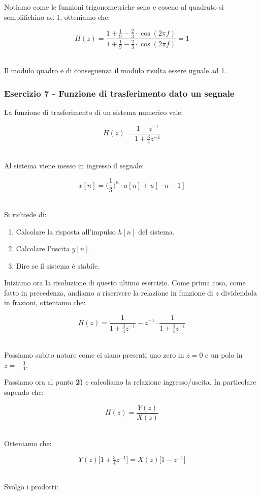 \documentclass[../main.tex]{subfiles}
\begin{document}
Notiamo come le funzioni trigonometriche seno e coseno al quadrato si semplifichino ad 1, otteniamo che:

\[  H(z) = \frac{1 + \tfrac{1}{9} - \tfrac{2}{3} \cdot \cos(2\pi f) }{1 + \tfrac{1}{9} - \tfrac{2}{3} \cdot \cos(2\pi f)}   =  1\]\

Il modulo quadro e di conseguenza il modulo risulta essere uguale ad 1.

\subsubsection{Esercizio 7 - Funzione di trasferimento dato un segnale}

La funzione di trasferimento di un sistema numerico vale:

\[ H(z) = \frac{1 - z^{-1} }{1 + \frac{3}{4} z^{-1}} \]\

Al sistema viene messo in ingresso il segnale:

\[ x[n] = \bigg(\frac{1}{3}\bigg)^n \cdot u[n] + u[-n -1] \]\

Si richiede di:

\begin{enumerate}
	\item[\textbf{1)}] Calcolare la risposta all’impulso $h[n]$ del sistema.
	\item[\textbf{2)}] Calcolare l’uscita $y[n]$.
	\item[\textbf{3)}] Dire se il sistema è stabile.
\end{enumerate}


Iniziamo ora la risoluzione di questo ultimo esercizio.
Come prima cosa, come fatto in precedenza, andiamo a riscrivere la relazione in funzione di $z$ dividendola in frazioni, otteniamo che:

\[ H(z) =  \frac{1}{1 + \tfrac{3}{4}z^{-1}} - z^{-1} \cdot \frac{1}{ 1 + \tfrac{3}{4}z^{-1}}\]\

Possiamo subito notare come ci siano presenti uno zero in $z=0$ e un polo in $z =- \tfrac{3}{4}$.




Passiamo ora al punto \textbf{2)} e calcoliamo la relazione ingresso/uscita.
In particolare sapendo che:

\[H(z) = \frac{Y(z)}{X(z)}\]\ 

Otteniamo che:

\[ Y(z) \big[ 1 + \tfrac{3}{4} z^{-1} \big] = X(z) \big[ 1 -z^{-1} \big]   \]\

Svolgo i prodotti:
\end{document}
